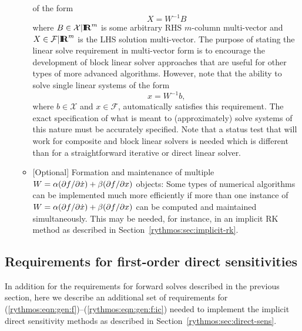 \documentclass[pdf,ps2pdf,11pt]{SANDreport}
\begin{document}
\begin{itemize}
\begin{itemize}
of the form
\[
X = W^{-1} B
\]
where $B\in\mathcal{X}|\mbox{\textbf{I}}\hspace{-0.6ex}\mbox{\textbf{R}}^m$ is some arbitrary RHS $m$-column multi-vector
and $X\in\mathcal{F}|\mbox{\textbf{I}}\hspace{-0.6ex}\mbox{\textbf{R}}^m$ is the LHS solution multi-vector.  The purpose of
stating the linear solve requirement in multi-vector form is to encourage the
development of block linear solver approaches that are useful for other types
of more advanced algorithms.  However, note that the ability to solve single
linear systems of the form
\[
x = W^{-1} b,
\]
where $b\in\mathcal{X}$ and $x\in\mathcal{F}$, automatically satisfies this
requirement.  The exact specification of what is meant to (approximately)
solve systems of this nature must be accurately specified. Note that a status
test that will work for composite and block linear solvers is needed which is
different than for a straightforward iterative or direct linear solver.
%
{}\item{} [Optional] Formation and maintenance of multiple $W = {}\alpha
(\partial f / \partial \dot{x}) + {}\beta (\partial f / \partial x)$ objects: Some types of numerical
algorithms can be implemented much more efficiently if more than one instance
of $W = {}\alpha (\partial f / \partial \dot{x}) + {}\beta (\partial f / \partial x)$ can be computed
and maintained simultaneously.  This may be needed, for instance, in an
implicit RK method as described in Section~\ref{rythmos:sec:implicit-rk}.
%
\end{itemize}

\end{itemize}

\subsection{Requirements for first-order direct sensitivities}

In addition for the requirements for forward solves described in the previous
section, here we describe an additional set of requirements for
(\ref{rythmos:eqn:gen:f})--(\ref{rythmos:eqn:gen:f:ic}) needed to implement
the implicit direct sensitivity methods as described in
Section~\ref{rythmos:sec:direct-sens}.
\end{document}
